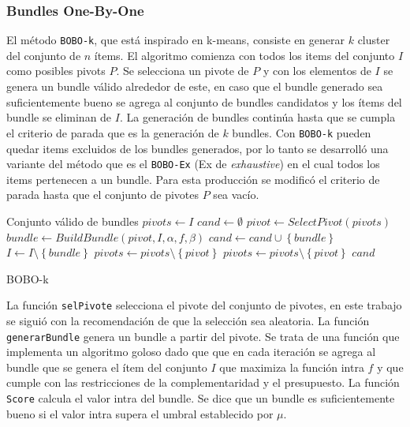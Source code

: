 \subsubsection{Bundles One-By-One}
El método \texttt{BOBO-k}, que está inspirado en k-means, consiste en generar $k$ cluster del conjunto de $n$ ítems. El algoritmo comienza con todos los items del conjunto $I$ como posibles pivots $P$. Se selecciona un pivote de $P$ y con los elementos de $I$ se genera un bundle válido alrededor de este, en caso que el bundle generado sea suficientemente bueno se agrega al conjunto de bundles candidatos y los ítems del bundle se eliminan de $I$. La generación de bundles continúa hasta que se cumpla el criterio de parada que es la generación de $k$ bundles. Con \texttt{BOBO-k} pueden quedar items excluidos de los bundles generados, por lo tanto se desarrolló una variante del método que es el \texttt{BOBO-Ex} (Ex de \textit{exhaustive}) en el cual todos los items pertenecen a un bundle. Para esta producción se modificó el criterio de parada hasta que el conjunto de pivotes $P$ sea vacío.\\

\begin{algorithm}[H]
\begin{algorithmic}[1]
\ENSURE Conjunto válido de bundles
\STATE $pivots \leftarrow I$
\STATE $cand \leftarrow \emptyset$
	\STATE $pivot \leftarrow SelectPivot(pivots)$
	\STATE $bundle \leftarrow BuildBundle(pivot,I,\alpha,f,\beta)$
		\STATE $cand \leftarrow cand \cup \left\{bundle\right\}$
		\STATE $I \leftarrow I \setminus \left\{bundle\right\}$
		\STATE $pivots \leftarrow pivots \setminus \left\{pivot\right\}$
	\ELSE
		\STATE $pivots \leftarrow pivots \setminus \left\{pivot\right\}$
	\ENDIF
\ENDWHILE
\RETURN $cand$
\end{algorithmic}
\caption{BOBO-k}\label{alg:bobo}
\end{algorithm}

La función \texttt{selPivote} selecciona el pivote del conjunto de pivotes, en este trabajo se siguió con la recomendación de \cite{newSimilarity} que la selección sea aleatoria. La función \texttt{generarBundle} genera un bundle a partir del pivote. Se trata de una función que implementa un algoritmo goloso dado que que en cada iteración se agrega al bundle que se genera el ítem del conjunto $I$ que maximiza la función intra $f$ y que cumple con las restricciones de la complementaridad y el presupuesto. La función \texttt{Score} calcula el valor intra del bundle. Se dice que un bundle es suficientemente bueno si el valor intra supera el umbral establecido por $\mu$.\\

